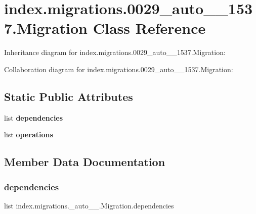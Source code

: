\hypertarget{classindex_1_1migrations_1_10029__auto__20171028__1537_1_1Migration}{}\section{index.\+migrations.0029\+\_\+auto\+\_\+\_\+1537.Migration Class Reference}
\label{classindex_1_1migrations_1_10029__auto__20171028__1537_1_1Migration}


Inheritance diagram for index.\+migrations.0029\+\_\+auto\+\_\+\_\+1537.Migration\+:


Collaboration diagram for index.\+migrations.0029\+\_\+auto\+\_\+\_\+1537.Migration\+:
\subsection*{Static Public Attributes}
\begin{DoxyCompactItemize}
\item 
list {\bfseries dependencies}
\item 
list {\bfseries operations}
\end{DoxyCompactItemize}


\subsection{Member Data Documentation}
\mbox{\label{classindex_1_1migrations_1_10029__auto__20171028__1537_1_1Migration_a67bf03658ef61c41ecc84d10a88b3ea3}} 
\subsubsection{\texorpdfstring{dependencies}{dependencies}}
{\footnotesize\ttfamily list index.\+migrations.\+\_\+auto\+\_\+\_.\+Migration.\+dependencies\hspace{0.3cm}{\ttfamily [static]}}

